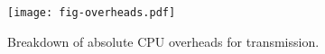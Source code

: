\begin{figure}[t]
\texttt{[image: fig-overheads.pdf]}
\caption{Breakdown of absolute CPU overheads for transmission.}
\label{fig:overheads}
\end{figure}
